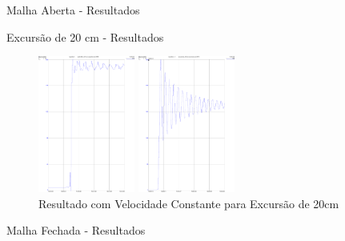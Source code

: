 \documentclass[10pt]{beamer}
\begin{document}
\begin{frame}[fragile]{Malha Aberta - Resultados}

\begin{block}{Excursão de 20 cm - Resultados}

\begin{figure}[!htb]
    \centering
    \begin{minipage}{.45\textwidth}
        \centering
        \includegraphics[width=1\linewidth,height=4.5cm]{figures/resultados/malha_aberta_2/percurso20cmBom.pdf}
        \caption{Resultado com Velocidade Modelada para Excursão de 20cm}
        \label{percurso20cmBom}
    \end{minipage}%
    \hspace{0.1cm}
    \begin{minipage}{0.45\textwidth}
        \centering
        \includegraphics[width=1\linewidth,height=4.5cm]{figures/resultados/malha_aberta_2/percurso20cmRuim.pdf}
        \caption{Resultado com Velocidade Constante para Excursão de 20cm}
        \label{percurso20cmRuim}
    \end{minipage}
\end{figure}
\end{block}
\end{frame}

\begin{frame}[fragile]{Malha Fechada - Resultados}

\end{frame}
\end{document}
